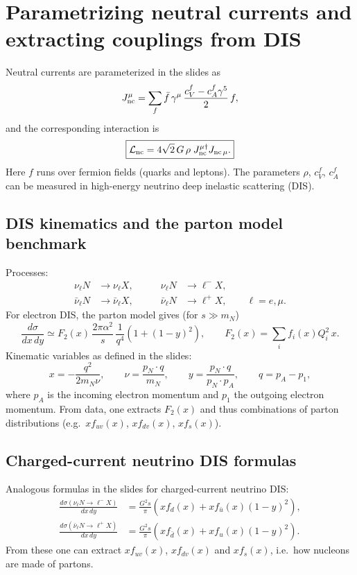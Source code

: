 \section{Parametrizing neutral currents and extracting couplings from DIS}
Neutral currents are parameterized in the slides as
\begin{equation}
J^\mu_{\rm nc}=\sum_f \bar f\,\gamma^\mu\,\frac{c_V^f-c_A^f\gamma^5}{2}\,f,
\end{equation}
and the corresponding interaction is
\begin{equation}
\boxed{
\mathcal{L}_{\rm nc}
=
4\sqrt{2}\,G\,\rho\;J^{\mu\dagger}_{\rm nc}J_{{\rm nc}\,\mu}.
}
\end{equation}
Here $f$ runs over fermion fields (quarks and leptons). The parameters $\rho$, $c_V^f$, $c_A^f$
can be measured in high-energy neutrino deep inelastic scattering (DIS).

\subsection{DIS kinematics and the parton model benchmark}
Processes:
\begin{align}
\nu_\ell N &\to \nu_\ell X,\qquad &\nu_\ell N &\to \ell^- X,\\
\bar\nu_\ell N &\to \bar\nu_\ell X,\qquad &\bar\nu_\ell N &\to \ell^+ X,
\qquad \ell=e,\mu.
\end{align}
For electron DIS, the parton model gives (for $s\gg m_N$)
\begin{equation}
\frac{d\sigma}{dx\,dy}
\simeq
F_2(x)\,\frac{2\pi\alpha^2}{s}\,\frac{1}{q^4}\left(1+(1-y)^2\right),
\qquad
F_2(x)=\sum_i f_i(x)Q_i^2\,x.
\end{equation}
Kinematic variables as defined in the slides:
\begin{equation}
x=-\frac{q^2}{2m_N\nu},
\qquad
\nu=\frac{p_N\cdot q}{m_N},
\qquad
y=\frac{p_N\cdot q}{p_N\cdot p_A},
\qquad
q=p_A-p_1,
\end{equation}
where $p_A$ is the incoming electron momentum and $p_1$ the outgoing electron momentum.
From data, one extracts $F_2(x)$ and thus combinations of parton distributions (e.g.\ $xf_{uv}(x)$, $xf_{dv}(x)$, $xf_s(x)$).

\subsection{Charged-current neutrino DIS formulas}
Analogous formulas in the slides for charged-current neutrino DIS:
\begin{align}
\frac{d\sigma(\nu_\ell N\to \ell^- X)}{dx\,dy}
&=
\frac{G^2 s}{\pi}\left(x f_d(x) + x f_{\bar u}(x)(1-y)^2\right),\\
\frac{d\sigma(\bar\nu_\ell N\to \ell^+ X)}{dx\,dy}
&=
\frac{G^2 s}{\pi}\left(x f_{\bar d}(x) + x f_{u}(x)(1-y)^2\right).
\end{align}
From these one can extract $xf_{uv}(x)$, $xf_{dv}(x)$ and $xf_s(x)$, i.e.\ how nucleons are made of partons.

